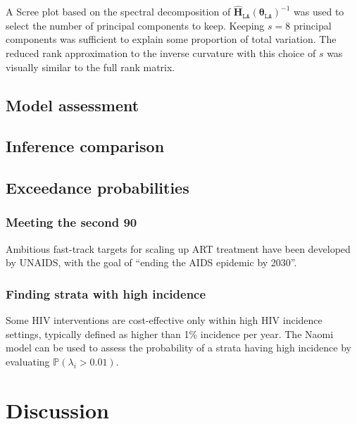 \documentclass[a4paper, nobind]{templates/ociamthesis}
\begin{document}
A Scree plot based on the spectral decomposition of \(\hat {\mathbf{H}}_\texttt{LA}(\boldsymbol{\mathbf{\theta}}_\texttt{LA})^{-1}\) was used to select the number of principal components to keep.
Keeping \(s = 8\) principal components was sufficient to explain some proportion of total variation.
The reduced rank approximation to the inverse curvature with this choice of \(s\) was visually similar to the full rank matrix.

\hypertarget{model-assessment}{%
\subsection{Model assessment}\label{model-assessment}}

\hypertarget{inference-comparison}{%
\subsection{Inference comparison}\label{inference-comparison}}

\hypertarget{exceedance-probabilities}{%
\subsection{Exceedance probabilities}\label{exceedance-probabilities}}

\hypertarget{meeting-the-second-90}{%
\subsubsection{Meeting the second 90}\label{meeting-the-second-90}}

Ambitious fast-track targets for scaling up ART treatment have been developed by UNAIDS, with the goal of ``ending the AIDS epidemic by 2030''.

\hypertarget{finding-strata-with-high-incidence}{%
\subsubsection{Finding strata with high incidence}\label{finding-strata-with-high-incidence}}

Some HIV interventions are cost-effective only within high HIV incidence settings, typically defined as higher than 1\% incidence per year.
The Naomi model can be used to assess the probability of a strata having high incidence by evaluating \(\mathbb{P}(\lambda_i > 0.01)\).

\hypertarget{discussion-2}{%
\section{Discussion}\label{discussion-2}}
\end{document}
